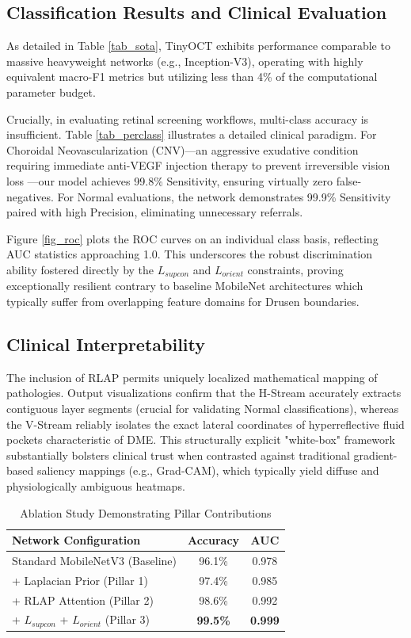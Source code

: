 \documentclass[journal]{IEEEtran}
\begin{document}
\subsection{Classification Results and Clinical Evaluation}
As detailed in Table \ref{tab_sota}, TinyOCT exhibits performance comparable to massive heavyweight networks (e.g., Inception-V3), operating with highly equivalent macro-F1 metrics but utilizing less than 4\% of the computational parameter budget.

Crucially, in evaluating retinal screening workflows, multi-class accuracy is insufficient. Table \ref{tab_perclass} illustrates a detailed clinical paradigm. For Choroidal Neovascularization (CNV)—an aggressive exudative condition requiring immediate anti-VEGF injection therapy to prevent irreversible vision loss \cite{kermany2018identifying}—our model achieves 99.8\% Sensitivity, ensuring virtually zero false-negatives. For Normal evaluations, the network demonstrates 99.9\% Sensitivity paired with high Precision, eliminating unnecessary referrals.

Figure \ref{fig_roc} plots the ROC curves on an individual class basis, reflecting AUC statistics approaching 1.0. This underscores the robust discrimination ability fostered directly by the $L_{supcon}$ and $L_{orient}$ constraints, proving exceptionally resilient contrary to baseline MobileNet architectures which typically suffer from overlapping feature domains for Drusen boundaries.

\subsection{Clinical Interpretability}
The inclusion of RLAP permits uniquely localized mathematical mapping of pathologies. Output visualizations confirm that the H-Stream accurately extracts contiguous layer segments (crucial for validating Normal classifications), whereas the V-Stream reliably isolates the exact lateral coordinates of hyperreflective fluid pockets characteristic of DME. This structurally explicit "white-box" framework substantially bolsters clinical trust when contrasted against traditional gradient-based saliency mappings (e.g., Grad-CAM), which typically yield diffuse and physiologically ambiguous heatmaps.

\begin{table}[htbp]
\caption{Ablation Study Demonstrating Pillar Contributions}
\begin{center}
\begin{tabular}{l c c}
\toprule
\textbf{Network Configuration} & \textbf{Accuracy} & \textbf{AUC} \\
\midrule
Standard MobileNetV3 (Baseline) & 96.1\% & 0.978 \\
+ Laplacian Prior (Pillar 1) & 97.4\% & 0.985 \\
+ RLAP Attention (Pillar 2) & 98.6\% & 0.992 \\
+ $L_{supcon}$ + $L_{orient}$ (Pillar 3) & \textbf{99.5\%} & \textbf{0.999} \\
\bottomrule
\end{tabular}
\label{tab_ablation}
\end{center}
\end{table}
\end{document}
